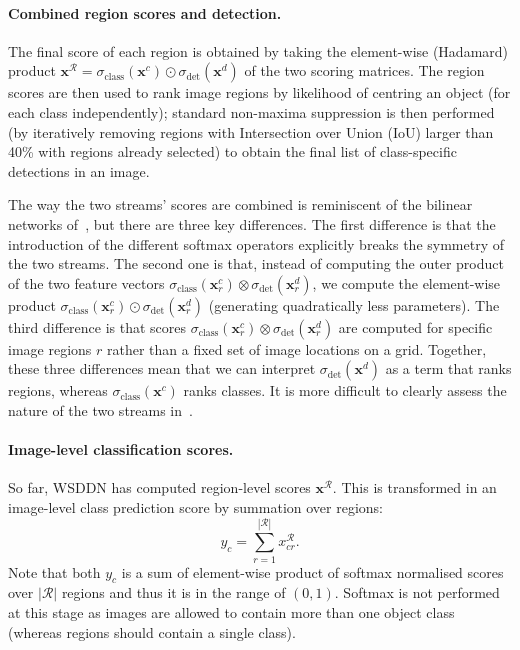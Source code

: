 \documentclass[10pt,twocolumn,letterpaper]{article}
\newcommand{\bx}{\mathbf{x}}
\begin{document}
\paragraph{Combined region scores and detection.} The final score of each region is obtained by taking the element-wise (Hadamard) product $\bx^\mathcal{R} = \sigma_\text{class}(\bx^c) \odot \sigma_\text{det}(\bx^d)$ of the two scoring matrices. The region scores are then used to rank image regions by likelihood of centring an object (for each class independently); standard non-maxima suppression is then performed (by iteratively removing regions with Intersection over Union (IoU) larger than 40\% with regions already selected) to obtain the final list of class-specific detections in an image.

The way the two streams' scores are combined is reminiscent of the bilinear networks of~\cite{Lin15}, but there are three key differences. The first difference is that the introduction of the different softmax operators explicitly breaks the symmetry of the two streams. The second one is that, instead of computing the outer product of the two feature vectors $\sigma_\text{class}(\bx^c_r) \otimes \sigma_\text{det}(\bx^d_r)$, we compute the element-wise product $\sigma_\text{class}(\bx^c_r) \odot \sigma_\text{det}(\bx^d_r)$ (generating quadratically less parameters). The third difference is that scores $\sigma_\text{class}(\bx^c_r) \otimes \sigma_\text{det}(\bx^d_r)$ are computed for specific image regions $r$ rather than a fixed set of image locations on a grid. Together, these three differences mean that we can interpret $\sigma_\text{det}(\bx^d)$ as a term that ranks regions, whereas $\sigma_\text{class}(\bx^c)$ ranks classes. It is more difficult to clearly assess the nature of the two streams in~\cite{Lin15}.

\paragraph{Image-level classification scores.} So far, WSDDN has computed region-level scores $\bx^\mathcal{R}$. This is transformed in an image-level class prediction score by summation over regions:
\[
   y_c = \sum_{r=1}^{|\mathcal{R}|} x^{\mathcal{R}}_{cr}.
\] 
Note that both $y_c$ is a sum of element-wise product of softmax normalised scores over $|\mathcal{R}|$ regions and thus it is in the range of $(0,1)$. Softmax is not performed at this stage as images are allowed to contain more than one object class (whereas regions should contain a single class).
\end{document}
